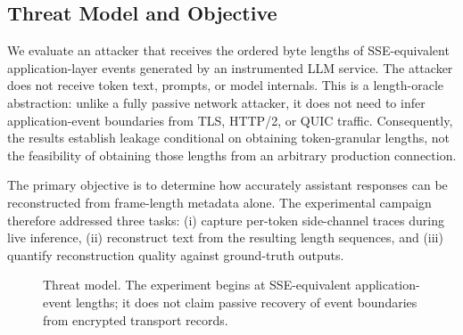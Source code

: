 \documentclass[journal,article,submit,pdftex,moreauthors]{Definitions/mdpi}
\begin{document}
\subsection{Threat Model and Objective}
We evaluate an attacker that receives the ordered byte lengths of SSE-equivalent application-layer events generated by an instrumented LLM service. The attacker does not receive token text, prompts, or model internals. This is a length-oracle abstraction: unlike a fully passive network attacker, it does not need to infer application-event boundaries from TLS, HTTP/2, or QUIC traffic. Consequently, the results establish leakage conditional on obtaining token-granular lengths, not the feasibility of obtaining those lengths from an arbitrary production connection.

The primary objective is to determine how accurately assistant responses can be reconstructed from frame-length metadata alone. The experimental campaign therefore addressed three tasks: (i) capture per-token side-channel traces during live inference, (ii) reconstruct text from the resulting length sequences, and (iii) quantify reconstruction quality against ground-truth outputs.

\begin{figure}[ht]
\centering
{}
\caption{Threat model. The experiment begins at SSE-equivalent application-event lengths; it does not claim passive recovery of event boundaries from encrypted transport records.}
\label{fig:threat_model}
\end{figure}
\end{document}
